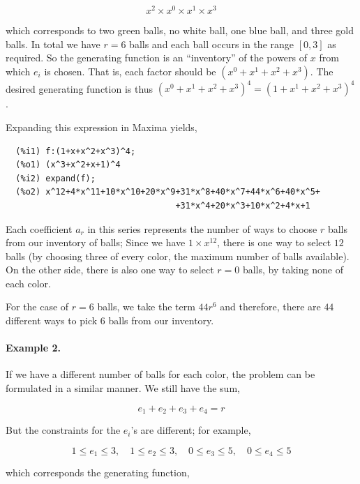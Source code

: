 \begin{equation*}
  x^{2} \times x^{0} \times x^{1} \times x^{3}
\end{equation*}

which corresponds to two green balls, no white ball, one blue ball, and three gold balls. In total we have $r=6$ balls and each ball occurs in the range $[0,3]$ as required. So the generating function is an “inventory” of the powers of $x$ from which $e_i$ is chosen. That is, each factor should be $(x^0 + x^1 + x^2 + x^3)$. The desired generating function is thus $(x^0 + x^1 + x^2 + x^3)^4 = (1 + x^1 + x^2 + x^3)^4$.

Expanding this expression in Maxima yields,

\begin{verbatim}
  (%i1)	f:(1+x+x^2+x^3)^4;
  (%o1)	(x^3+x^2+x+1)^4
  (%i2)	expand(f);
  (%o2)	x^12+4*x^11+10*x^10+20*x^9+31*x^8+40*x^7+44*x^6+40*x^5+
                                  +31*x^4+20*x^3+10*x^2+4*x+1
\end{verbatim}

Each coefficient $a_r$ in this series represents the number of ways to choose $r$ balls from our inventory of balls; Since we have $1 \times x^{12}$, there is one way to select $12$ balls (by choosing three of every color, the maximum number of balls available). On the other side, there is also one way to select $r=0$ balls, by taking none of each color.

For the case of $r=6$ balls, we take the term $44 r^6$ and therefore, there are $44$ different ways to pick $6$ balls from our inventory.

\paragraph{Example 2.} If we have a different number of balls for each color, the problem can be formulated in a similar manner. We still have the sum,

\begin{equation*}
  e_1 + e_2 + e_3 + e_4 = r
\end{equation*}

But the constraints for the $e_i$'s are different; for example,

\begin{equation*}
  1 \leq e_1 \leq 3, \quad 1 \leq e_2 \leq 3, \quad 0 \leq e_3 \leq 5, \quad  0 \leq e_4 \leq 5
\end{equation*}

which corresponds the generating function,

